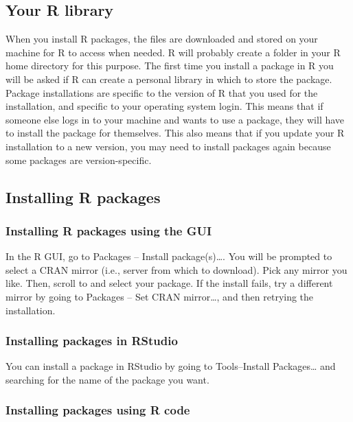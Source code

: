 \documentclass[
  13,
  letterpaper,
]{report}
\begin{document}
\subsection{Your R library}\label{sec-r-pack-lib}

When you install R packages, the files are downloaded and stored on your
machine for R to access when needed. R will probably create a folder in
your R home directory for this purpose. The first time you install a
package in R you will be asked if R can create a personal library in
which to store the package. Package installations are specific to the
version of R that you used for the installation, and specific to your
operating system login. This means that if someone else logs in to your
machine and wants to use a package, they will have to install the
package for themselves. This also means that if you update your R
installation to a new version, you may need to install packages again
because some packages are version-specific.

\subsection{Installing R packages}\label{sec-r-pack-install}

\subsubsection{Installing R packages using the
GUI}\label{installing-r-packages-using-the-gui}

In the R GUI, go to Packages -- Install package(s)\ldots. You will be
prompted to select a CRAN mirror (i.e., server from which to download).
Pick any mirror you like. Then, scroll to and select your package. If
the install fails, try a different mirror by going to Packages -- Set
CRAN mirror\ldots, and then retrying the installation.

\subsubsection{Installing packages in
RStudio}\label{installing-packages-in-rstudio}

You can install a package in RStudio by going to Tools--Install
Packages\ldots{} and searching for the name of the package you want.

\subsubsection{Installing packages using R
code}\label{installing-packages-using-r-code}
\end{document}
